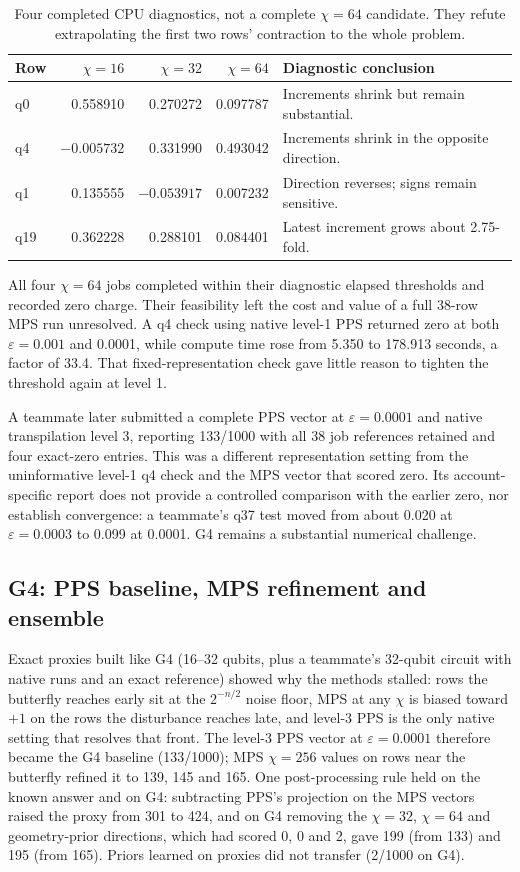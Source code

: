 \documentclass[11pt]{article}
\newcommand{\eps}{\varepsilon}
\begin{document}
\begin{table}[h!]
\centering
\small
\begin{tabularx}{\textwidth}{@{}lrrrX@{}}
\toprule
Row & $\chi=16$ & $\chi=32$ & $\chi=64$ & Diagnostic conclusion \\
\midrule
q0 & 0.558910 & 0.270272 & 0.097787 & Increments shrink but remain substantial. \\
q4 & $-0.005732$ & 0.331990 & 0.493042 & Increments shrink in the opposite direction. \\
q1 & 0.135555 & $-0.053917$ & 0.007232 & Direction reverses; signs remain sensitive. \\
q19 & 0.362228 & 0.288101 & 0.084401 & Latest increment grows about 2.75-fold. \\
\bottomrule
\end{tabularx}
\caption{Four completed CPU diagnostics, not a complete $\chi=64$ candidate. They refute extrapolating the first two rows' contraction to the whole problem.}
\end{table}

All four $\chi=64$ jobs completed within their diagnostic elapsed thresholds and recorded zero charge. Their feasibility left the cost and value of a full 38-row MPS run unresolved. A q4 check using native level-1 PPS returned zero at both $\eps=0.001$ and 0.0001, while compute time rose from 5.350 to 178.913 seconds, a factor of 33.4. That fixed-representation check gave little reason to tighten the threshold again at level 1.\cite{decisions,gpu}

A teammate later submitted a complete PPS vector at $\eps=0.0001$ and native transpilation level 3, reporting 133/1000 with all 38 job references retained and four exact-zero entries. This was a different representation setting from the uninformative level-1 q4 check and the MPS vector that scored zero. Its account-specific report does not provide a controlled comparison with the earlier zero, nor establish convergence: a teammate's q37 test moved from about 0.020 at $\eps=0.0003$ to 0.099 at 0.0001. G4 remains a substantial numerical challenge.\cite{ledger,teammate-1}

\subsection{G4: PPS baseline, MPS refinement and ensemble}
Exact proxies built like G4 (16--32 qubits, plus a teammate's 32-qubit circuit with native runs and an exact reference) showed why the methods stalled: rows the butterfly reaches early sit at the $2^{-n/2}$ noise floor, MPS at any $\chi$ is biased toward $+1$ on the rows the disturbance reaches late, and level-3 PPS is the only native setting that resolves that front. The level-3 PPS vector at $\eps=0.0001$ therefore became the G4 baseline (133/1000); MPS $\chi=256$ values on rows near the butterfly refined it to 139, 145 and 165. One post-processing rule held on the known answer and on G4: subtracting PPS's projection on the MPS vectors raised the proxy from 301 to 424, and on G4 removing the $\chi=32$, $\chi=64$ and geometry-prior directions, which had scored 0, 0 and 2, gave 199 (from 133) and 195 (from 165). Priors learned on proxies did not transfer (2/1000 on G4).
\end{document}
